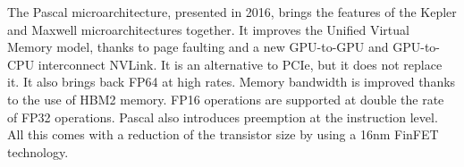 The Pascal microarchitecture, presented in 2016, brings the features of the Kepler and Maxwell microarchitectures together.
It improves the Unified Virtual Memory model, thanks to page faulting and a new GPU-to-GPU and GPU-to-CPU interconnect NVLink.
It is an alternative to PCIe, but it does not replace it.
It also brings back FP64 at high rates.
Memory bandwidth is improved thanks to the use of HBM2 memory.
FP16 operations are supported at double the rate of FP32 operations.
Pascal also introduces preemption at the instruction level.
All this comes with a reduction of the transistor size by using a 16nm FinFET technology.

%
%
%

